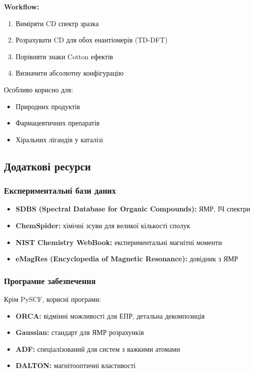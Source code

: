 \textbf{Workflow:}
\begin{enumerate}
    \item Виміряти CD спектр зразка
    \item Розрахувати CD для обох енантіомерів (TD-DFT)
    \item Порівняти знаки Cotton ефектів
    \item Визначити абсолютну конфігурацію
\end{enumerate}

Особливо корисно для:
\begin{itemize}
    \item Природних продуктів
    \item Фармацевтичних препаратів
    \item Хіральних лігандів у каталізі
\end{itemize}

\subsection{Додаткові ресурси}

\subsubsection{Експериментальні бази даних}

\begin{itemize}
    \item \textbf{SDBS (Spectral Database for Organic Compounds):} ЯМР, ІЧ спектри
    \item \textbf{ChemSpider:} хімічні зсуви для великої кількості сполук
    \item \textbf{NIST Chemistry WebBook:} експериментальні магнітні моменти
    \item \textbf{eMagRes (Encyclopedia of Magnetic Resonance):} довідник з ЯМР
\end{itemize}

\subsubsection{Програмне забезпечення}

Крім PySCF, корисні програми:
\begin{itemize}
    \item \textbf{ORCA:} відмінні можливості для ЕПР, детальна декомпозиція
    \item \textbf{Gaussian:} стандарт для ЯМР розрахунків
    \item \textbf{ADF:} спеціалізований для систем з важкими атомами
    \item \textbf{DALTON:} магнітооптичні властивості
\end{itemize}

